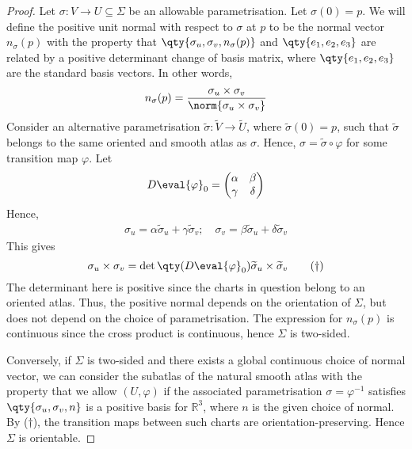 \begin{proof}
	Let $\sigma \colon V \to U \subseteq \Sigma$ be an allowable parametrisation.
	Let $\sigma(0) = p$.
	We will define the positive unit normal with respect to $\sigma$ at $p$ to be the normal vector $n_\sigma(p)$ with the property that $\qty{\sigma_u, \sigma_v, n_\sigma(p)}$ and $\qty{e_1, e_2, e_3}$ are related by a positive determinant change of basis matrix, where $\qty{e_1, e_2, e_3}$ are the standard basis vectors.
	In other words,
	\begin{align*}
		n_\sigma(p) = \frac{\sigma_u \times \sigma_v}{\norm{\sigma_u \times \sigma_v}}
	\end{align*}
	Consider an alternative parametrisation $\widetilde \sigma \colon \widetilde V \to \widetilde U$, where $\widetilde \sigma(0) = p$, such that $\widetilde \sigma$ belongs to the same oriented and smooth atlas as $\sigma$.
	Hence, $\sigma = \widetilde \sigma \circ \varphi$ for some transition map $\varphi$.
	Let
	\begin{align*}
		D \eval{\varphi}_0 = \begin{pmatrix}
			\alpha & \beta  \\
			\gamma & \delta
		\end{pmatrix}
	\end{align*}
	Hence,
	\begin{align*}
		\sigma_u = \alpha \widetilde \sigma_u + \gamma \widetilde \sigma_v;\quad \sigma_v = \beta \widetilde \sigma_u + \delta \widetilde \sigma_v
	\end{align*}
	This gives
	\begin{equation}
		\sigma_u \times \sigma_v = \det\qty(D \eval{\varphi}_0) \widetilde \sigma_u \times \widetilde \sigma_v \tag{$\dagger$}
	\end{equation}
	The determinant here is positive since the charts in question belong to an oriented atlas.
	Thus, the positive normal depends on the orientation of $\Sigma$, but does not depend on the choice of parametrisation.
	The expression for $n_\sigma(p)$ is continuous since the cross product is continuous, hence $\Sigma$ is two-sided.

	Conversely, if $\Sigma$ is two-sided and there exists a global continuous choice of normal vector, we can consider the subatlas of the natural smooth atlas with the property that we allow $(U,\varphi)$ if the associated parametrisation $\sigma = \varphi^{-1}$ satisfies $\qty{\sigma_u, \sigma_v, n}$ is a positive basis for $\mathbb R^3$, where $n$ is the given choice of normal.
	By ($\dagger$), the transition maps between such charts are orientation-preserving.
	Hence $\Sigma$ is orientable.
\end{proof}
